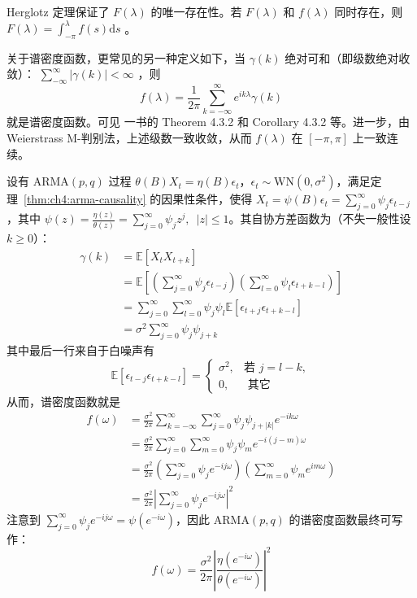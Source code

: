 Herglotz 定理保证了 $F(\lambda)$ 的唯一存在性。若 $F(\lambda)$ 和 $f(\lambda)$ 同时存在，则 $F(\lambda)=\int_{-\pi}^\lambda f(s)\mathrm{d}s$ 。

关于谱密度函数，更常见的另一种定义如下，当 $\gamma(k)$ 绝对可和（即级数绝对收敛）： $\sum_{-\infty}^\infty |\gamma(k)|<\infty$ ，则 \[ f(\lambda)=\frac1{2\pi}\sum_{k=-\infty}^\infty e^{ik\lambda}\gamma(k) \]就是谱密度函数。可见 \cite{brockwelldavis2006} 一书的 Theorem 4.3.2 和 Corollary 4.3.2 等。进一步，由 Weierstrass M-判别法，上述级数一致收敛，从而 $f(\lambda)$ 在 $[-\pi,\pi]$ 上一致连续。

\begin{example}
设有 $\mathrm{ARMA}(p,q)$ 过程 $\theta(B)X_t = \eta(B)\epsilon_t$，$\epsilon_t\sim \mathrm{WN}(0, \sigma^2)$，满足定理~\ref{thm:ch4:arma-causality} 的因果性条件，使得 $X_t=\psi(B)\epsilon_t=\sum_{j=0}^\infty\psi_j\epsilon_{t-j}$，其中 $\psi(z)=\frac{\eta(z)}{\theta(z)}=\sum\limits_{j=0}^\infty\psi_jz^j,\enspace |z|\le 1$。其自协方差函数为（不失一般性设 $k\ge 0$）：
\[\begin{aligned} \gamma(k)&=\mathbb{E}[X_tX_{t+k}]\\ &=\mathbb{E}\!\left[\left(\sum_{j=0}^\infty\psi_j\epsilon_{t-j}\right)\left(\sum_{l=0}^\infty\psi_l\epsilon_{t+k-l}\right)\right]\\ &=\sum_{j=0}^\infty\sum_{l=0}^\infty \psi_j\psi_l\mathbb{E}[\epsilon_{t+j}\epsilon_{t+k-l}]\\ &=\sigma^2\sum_{j=0}^\infty\psi_j\psi_{j+k} \end{aligned}\]
其中最后一行来自于白噪声有\[ \mathbb{E}[\epsilon_{t-j} \epsilon_{t+k-l}] = \begin{cases} \sigma^2, & \text{若 } j = l-k, \\ 0, & \text{ 其它 } \end{cases} \]
从而，谱密度函数就是
\[\begin{aligned} f(\omega) &= \frac{\sigma^2}{2\pi} \sum_{k=-\infty}^{\infty} \sum_{j=0}^{\infty} \psi_j \psi_{j+|k|} e^{-i k \omega} \\ &= \frac{\sigma^2}{2\pi} \sum_{j=0}^{\infty} \sum_{m=0}^{\infty} \psi_j \psi_m e^{-i (j-m) \omega}   \\ &= \frac{\sigma^2}{2\pi} \left( \sum_{j=0}^{\infty} \psi_j e^{-i j \omega} \right) \left( \sum_{m=0}^{\infty} \psi_m e^{i m \omega} \right) \\ &= \frac{\sigma^2}{2\pi} \left| \sum_{j=0}^{\infty} \psi_j e^{-i j \omega} \right|^2 \end{aligned}\]
注意到 $\sum_{j=0}^{\infty} \psi_j e^{-i j \omega} = \psi(e^{-i\omega})$，因此 $\mathrm{ARMA}(p,q)$ 的谱密度函数最终可写作：
\[f(\omega)=\frac{\sigma^2}{2\pi}\left|\frac{\eta(e^{-i\omega})}{\theta(e^{-i\omega})}\right|^2\]

\end{example}


